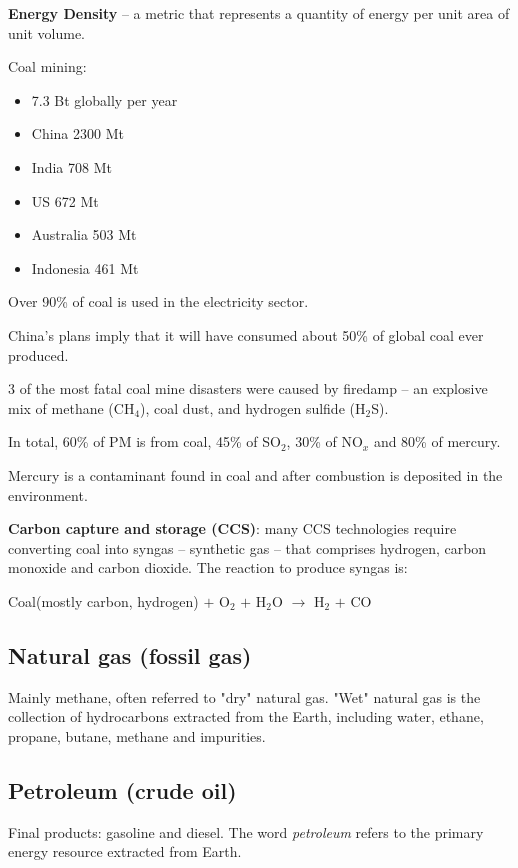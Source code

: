 \textbf{Energy Density} -- a metric that represents a quantity of energy per
unit area of unit volume.

Coal mining: 
\begin{itemize}
	\item 7.3 Bt globally per year
	\item China 2300 Mt
	\item India 708 Mt
	\item US 672 Mt
	\item Australia 503 Mt
	\item Indonesia 461 Mt
\end{itemize}

Over 90\% of coal is used in the electricity sector.

China's plans imply that it will have consumed about 50\% of global coal ever
produced.

3 of the most fatal coal mine disasters were caused by firedamp -- an explosive
mix of methane (CH$_4$), coal dust, and hydrogen sulfide (H$_2$S).

In total, 60\% of PM is from coal, 45\% of SO$_2$, 30\% of NO$_x$ and 80\%
of mercury.

Mercury is a contaminant found in coal and after combustion is deposited in the
environment.

\textbf{Carbon capture and storage (CCS)}: many CCS technologies require
converting coal into syngas -- synthetic gas -- that comprises hydrogen,
carbon monoxide and carbon dioxide. The reaction to produce syngas is:

Coal(mostly carbon, hydrogen) $+$ O$_2$ $+$ H$_2$O $\rightarrow$ H$_2$ $+$ CO

\subsection{Natural gas (fossil gas)}

Mainly methane, often referred to "dry" natural gas. "Wet" natural gas is the
collection of hydrocarbons extracted from the Earth, including water, ethane,
propane, butane, methane and impurities.

\subsection{Petroleum (crude oil)}

Final products: gasoline and diesel. The word \textit{petroleum} refers to the
primary energy resource extracted from Earth.

